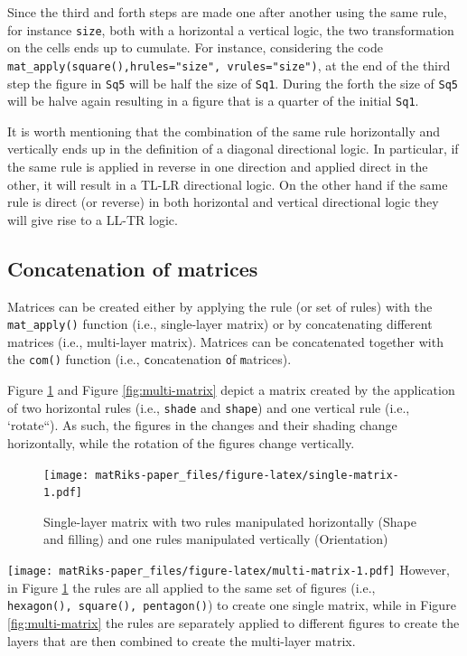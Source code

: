 Since the third and forth steps are made one after another using the same rule, for instance \texttt{size}, both with a horizontal a vertical logic, the two transformation on the cells ends up to cumulate.
For instance, considering the code \texttt{mat\_apply(square(),hrules="size",\ vrules="size")}, at the end of the third step the figure in \texttt{Sq5} will be half the size of \texttt{Sq1}.
During the forth the size of \texttt{Sq5} will be halve again resulting in a figure that is a quarter of the initial \texttt{Sq1}.

It is worth mentioning that the combination of the same rule horizontally and vertically ends up in the definition of a diagonal directional logic.
In particular, if the same rule is applied in reverse in one direction and applied direct in the other, it will result in a TL-LR directional logic.
On the other hand if the same rule is direct (or reverse) in both horizontal and vertical directional logic they
will give rise to a LL-TR logic.

\hypertarget{concatenation-of-matrices}{%
\subsection{Concatenation of matrices}\label{concatenation-of-matrices}}

Matrices can be created either by applying the rule (or set of rules) with the \texttt{mat\_apply()} function (i.e., single-layer matrix) or by concatenating different matrices (i.e., multi-layer matrix). Matrices can be concatenated together with the \texttt{com()} function (i.e., \texttt{c}oncatenation \texttt{o}f \texttt{m}atrices).

Figure \ref{fig:single-matrix} and Figure \ref{fig:multi-matrix} depict a matrix created by the application of two horizontal rules (i.e., \texttt{shade} and \texttt{shape}) and one vertical rule (i.e., `rotate``). As such, the figures in the changes and their shading change horizontally, while the rotation of the figures change vertically.

\begin{figure}
\centering
\texttt{[image: matRiks-paper\_files/figure-latex/single-matrix-1.pdf]}
\caption{\label{fig:single-matrix}Single-layer matrix with two rules manipulated horizontally (Shape and filling) and one rules manipulated vertically (Orientation)}
\end{figure}

\texttt{[image: matRiks-paper\_files/figure-latex/multi-matrix-1.pdf]}
However, in Figure \ref{fig:single-matrix} the rules are all applied to the same set of figures (i.e., \texttt{hexagon(),\ square(),\ pentagon()}) to create one single matrix, while in Figure \ref{fig:multi-matrix} the rules are separately applied to different figures to create the layers that are then combined to create the multi-layer matrix.

